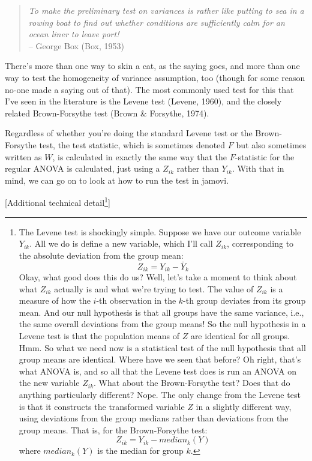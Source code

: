 \documentclass[
  a4paper,
]{book}
\begin{document}
\begin{quote}
\emph{To make the preliminary test on variances is rather like putting
to sea in a rowing boat to find out whether conditions are sufficiently
calm for an ocean liner to leave port!}\\
-- George Box (Box, 1953)
\end{quote}

There's more than one way to skin a cat, as the saying goes, and more
than one way to test the homogeneity of variance assumption, too (though
for some reason no-one made a saying out of that). The most commonly
used test for this that I've seen in the literature is the Levene test
(Levene, 1960), and the closely related Brown-Forsythe test (Brown \&
Forsythe, 1974).

Regardless of whether you're doing the standard Levene test or the
Brown-Forsythe test, the test statistic, which is sometimes denoted
\(F\) but also sometimes written as \(W\), is calculated in exactly the
same way that the \(F\)-statistic for the regular ANOVA is calculated,
just using a \(Z_{ik}\) rather than \(Y_{ik}\). With that in mind, we
can go on to look at how to run the test in jamovi.

{[}Additional technical detail\footnote{The Levene test is shockingly
  simple. Suppose we have our outcome variable \(Y_{ik}\). All we do is
  define a new variable, which I'll call \(Z_{ik}\), corresponding to
  the absolute deviation from the group mean:
  \[Z_{ik}=Y_{ik}-\bar{Y}_{k}\] Okay, what good does this do us? Well,
  let's take a moment to think about what \(Z_{ik}\) actually is and
  what we're trying to test. The value of \(Z_{ik}\) is a measure of how
  the \(i\)-th observation in the \(k\)-th group deviates from its group
  mean. And our null hypothesis is that all groups have the same
  variance, i.e., the same overall deviations from the group means! So
  the null hypothesis in a Levene test is that the population means of
  \(Z\) are identical for all groups. Hmm. So what we need now is a
  statistical test of the null hypothesis that all group means are
  identical. Where have we seen that before? Oh right, that's what ANOVA
  is, and so all that the Levene test does is run an ANOVA on the new
  variable \(Z_{ik}\). What about the Brown-Forsythe test? Does that do
  anything particularly different? Nope. The only change from the Levene
  test is that it constructs the transformed variable \(Z\) in a
  slightly different way, using deviations from the group medians rather
  than deviations from the group means. That is, for the Brown-Forsythe
  test: \[Z_{ik}=Y_{ik}-median_k(Y)\] where \(median_k(Y)\) is the
  median for group \(k\).}{]}
\end{document}
